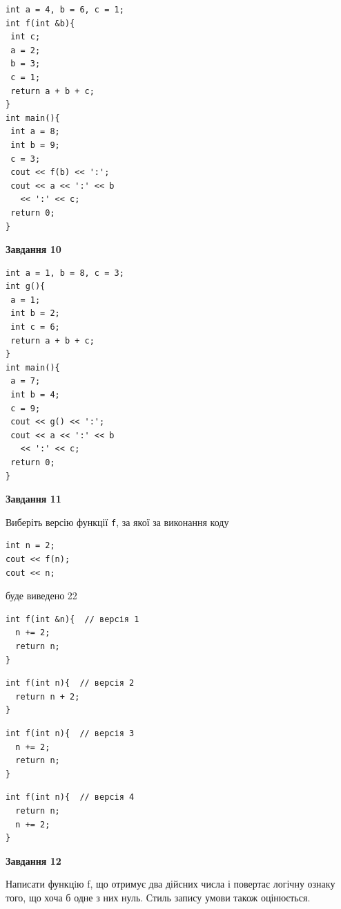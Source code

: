 \documentclass[12pt, ukrainian]{article}
\def\code#1{\Verb!#1!}
\begin{document}
{\begin {large}
\begin{minipage}[t]{7.0cm}
\begin{verbatim}
int a = 4, b = 6, c = 1;
int f(int &b){
 int c;
 a = 2;
 b = 3;
 c = 1;
 return a + b + c;
}
int main(){
 int a = 8;
 int b = 9;
 c = 3;
 cout << f(b) << ':';
 cout << a << ':' << b 
   << ':' << c;
 return 0;
}
\end{verbatim}



\begin{center}
\textbf{Завдання 10}
\end{center}
\vspace{-8mm}

\begin{verbatim}
int a = 1, b = 8, c = 3;
int g(){
 a = 1;
 int b = 2;
 int c = 6;
 return a + b + c;
}
int main(){
 a = 7;
 int b = 4;
 c = 9;
 cout << g() << ':';
 cout << a << ':' << b 
   << ':' << c;
 return 0;
}
\end{verbatim}

\end{minipage}
\vline \hspace{1mm}
\begin{minipage}[t]{11.0cm}

\begin{center}
\textbf{Завдання 11}
\end{center}
Виберіть версію функції \code{f}, за якої за виконання коду
\begin{verbatim}
int n = 2;
cout << f(n);
cout << n;
\end{verbatim}

буде виведено 22

\begin{verbatim}
int f(int &n){  // версія 1
  n += 2;
  return n;
}
\end{verbatim}

\vspace{-8mm}\begin{verbatim}
int f(int n){  // версія 2
  return n + 2;
}
\end{verbatim}

\vspace{-8mm}\begin{verbatim}
int f(int n){  // версія 3
  n += 2;
  return n;
}
\end{verbatim}

\vspace{-8mm}\begin{verbatim}
int f(int n){  // версія 4
  return n;
  n += 2;
}
\end{verbatim}



\begin{center}
\textbf{Завдання 12}
\end{center}

Написати функцiю f, що отримує два дійсних числа і повертає логічну ознаку того, що хоча б одне з них нуль. Стиль запису умови також оцінюється.\par

\end{minipage}

\end {large}}
\newpage
\end{document}
